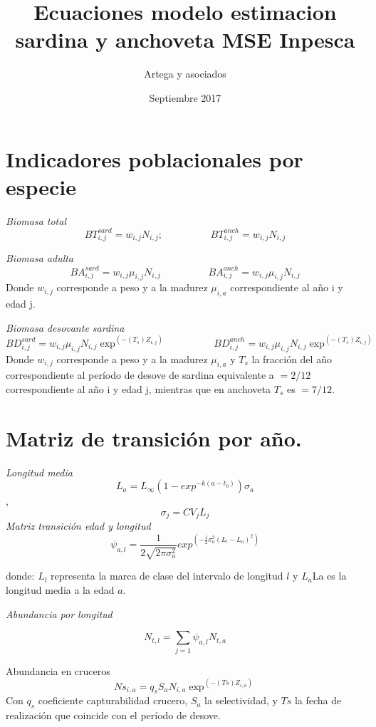\documentclass[18pt,]{article}
\title{Ecuaciones modelo estimacion sardina y anchoveta MSE Inpesca}
\author{Artega y asociados}
\date{Septiembre 2017}
\begin{document}
\maketitle

\section{Indicadores poblacionales por
especie}\label{indicadores-poblacionales-por-especie}

\emph{Biomasa total} \[
BT_{i,j}^{sard}=w_{i,j}N_{i,j};\hspace{2cm}   BT_{i,j}^{anch}=w_{i,j}N_{i,j}
\]

\emph{Biomasa adulta} \[
BA_{i,j}^{sard}=w_{i,j}\mu_{i,j}N_{i,j}\hspace{2cm} BA_{i,j}^{anch}=w_{i,j}\mu_{i,j}N_{i,j}
\] Donde \(w_{i,j}\) corresponde a peso y a la madurez \(\mu_{i,a}\)
correspondiente al año i y edad j.

\emph{Biomasa desovante sardina} \[
BD_{i,j}^{sard}=w_{i,j}\mu_{i,j}N_{i,j}\exp^{(-(T_{s})Z_{i,j})} \hspace{2cm}BD_{i,j}^{anch}=w_{i,j}\mu_{i,j}N_{i,j}\exp^{(-(T_{s})Z_{i,j})}
\] Donde \(w_{i,j}\) corresponde a peso y a la madurez \(\mu_{i,a}\) y
\(T_s\) la fracción del año correspondiente al período de desove de
sardina equivalente a \(=2/12\) correspondiente al año i y edad j,
mientras que en anchoveta \(T_s\) es \(=7/12\).

\section{Matriz de transición por
año.}\label{matriz-de-transicion-por-ano.}

\emph{Longitud media}
\[L_{a}=L_{\infty} (1-exp^{-k(a-t_{0})})\sigma_{a}\],\hspace{2cm}
\[\sigma_{j}=CV_{j}L_{j}\] \emph{Matriz transición edad y longitud} \[
\psi_{a,l}={\frac{1} {2 \sqrt{{2\pi\sigma_{a}^{2}}}}} exp^{\left(-\frac{1}{2}\sigma_{a}^{2}(L_{l}-L_{a})^2 \right) }
\]

donde: \(L_{l}\) representa la marca de clase del intervalo de longitud
\(l\) y \(L_{a}\)La es la longitud media a la edad \(a\).

\emph{Abundancia por longitud}

\[N_{t,l}=\sum_{j=1}\psi_{a,l}N_{t,a}\]

Abundancia en cruceros \[
Ns_{i,a}=q_{s}S_{a}N_{i,a}\exp^{(-(Ts)Z_{i,a})}
\] Con \(q_{s}\) coeficiente capturabilidad crucero, \(S_a\) la
selectividad, y \(Ts\) la fecha de realización que coincide con el
período de desove.
\end{document}
